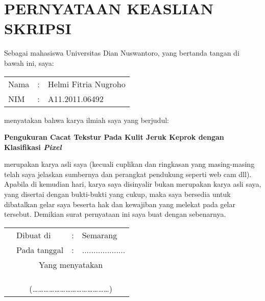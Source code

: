 \documentclass[laporan.tex]{subfiles}
\begin{document}
\chapter*{PERNYATAAN KEASLIAN SKRIPSI}

Sebagai mahasiswa Universitas Dian Nuswantoro, yang bertanda tangan di bawah ini, saya:

\begin{tabular}{l c l}
Nama & : & Helmi Fitria Nugroho \\
NIM & : & A11.2011.06492 \\
\end{tabular}

menyatakan bahwa karya ilmiah saya yang berjudul:

\begin{centering}
\bfseries Pengukuran Cacat Tekstur Pada Kulit Jeruk Keprok dengan Klasifikasi \emph{Pixel}
\end{centering}

merupakan karya asli saya (kecuali cuplikan dan ringkasan yang masing-masing telah saya jelaskan sumbernya dan perangkat pendukung seperti web cam dll). Apabila di kemudian hari, karya saya disinyalir bukan merupakan karya asli saya, yang disertai dengan bukti-bukti yang cukup, maka saya bersedia untuk dibatalkan gelar saya beserta hak dan kewajiban yang melekat pada gelar tersebut. Demikian surat pernyataan ini saya buat dengan sebenarnya.

\begin{tabular}{p{10em} l c l}
& Dibuat di & : & Semarang \\
& Pada tanggal & : & ................... \\
& \multicolumn{3}{c}{Yang menyatakan} \\
& & & \\
& & & \\
& & & \\
& \multicolumn{3}{c}{(\ldots \ldots \ldots \ldots \ldots \ldots \ldots \ldots \ldots \ldots \ldots \ldots \ldots \ldots)} \\
\end{tabular}
\end{document}
